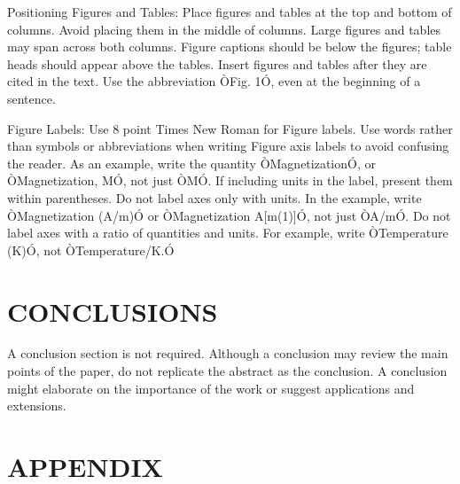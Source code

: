 \documentclass[letterpaper, 10 pt, conference]{ieeeconf}  %
\begin{document}
Positioning Figures and Tables: Place figures and tables at the top and bottom of columns. Avoid placing them in the middle of columns. Large figures and tables may span across both columns. Figure captions should be below the figures; table heads should appear above the tables. Insert figures and tables after they are cited in the text. Use the abbreviation ÒFig. 1Ó, even at the beginning of a sentence.


Figure Labels: Use 8 point Times New Roman for Figure labels. Use words rather than symbols or abbreviations when writing Figure axis labels to avoid confusing the reader. As an example, write the quantity ÒMagnetizationÓ, or ÒMagnetization, MÓ, not just ÒMÓ. If including units in the label, present them within parentheses. Do not label axes only with units. In the example, write ÒMagnetization (A/m)Ó or ÒMagnetization {A[m(1)]}Ó, not just ÒA/mÓ. Do not label axes with a ratio of quantities and units. For example, write ÒTemperature (K)Ó, not ÒTemperature/K.Ó

\section{CONCLUSIONS}

A conclusion section is not required. Although a conclusion may review the main points of the paper, do not replicate the abstract as the conclusion. A conclusion might elaborate on the importance of the work or suggest applications and extensions. 

\addtolength{\textheight}{-12cm}   %







\section*{APPENDIX}
\end{document}
